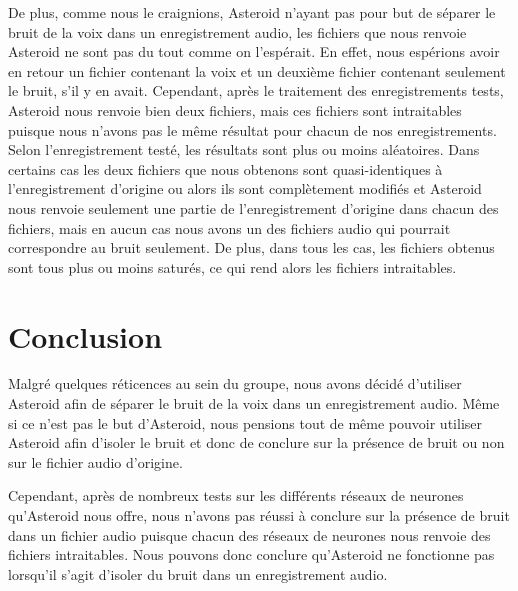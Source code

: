 \documentclass{article}
\begin{document}
De plus, comme nous le craignions, Asteroid n'ayant pas pour but de séparer le bruit de la voix dans un enregistrement audio, les fichiers que nous renvoie Asteroid ne sont pas du tout comme on l'espérait. En effet, nous espérions avoir en retour un fichier contenant la voix et un deuxième fichier contenant seulement le bruit, s'il y en avait. Cependant, après le traitement des enregistrements tests, Asteroid nous renvoie bien deux fichiers, mais ces fichiers sont intraitables puisque nous n'avons pas le même résultat pour chacun de nos enregistrements. Selon l'enregistrement testé, les résultats sont plus ou moins aléatoires. Dans certains cas les deux fichiers que nous obtenons sont quasi-identiques à l'enregistrement d'origine ou alors ils sont complètement modifiés et Asteroid nous renvoie seulement une partie de l'enregistrement d'origine dans chacun des fichiers, mais en aucun cas nous avons un des fichiers audio qui pourrait correspondre au bruit seulement. De plus, dans tous les cas, les fichiers obtenus sont tous plus ou moins saturés, ce qui rend alors les fichiers intraitables.

\section{Conclusion}

Malgré quelques réticences au sein du groupe, nous avons décidé d'utiliser Asteroid afin de séparer le bruit de la voix dans un enregistrement audio. Même si ce n'est pas le but d'Asteroid, nous pensions tout de même pouvoir utiliser Asteroid afin d'isoler le bruit et donc de conclure sur la présence de bruit ou non sur le fichier audio d'origine.

Cependant, après de nombreux tests sur les différents réseaux de neurones qu'Asteroid nous offre, nous n'avons pas réussi à conclure sur la présence de bruit dans un fichier audio puisque chacun des réseaux de neurones nous renvoie des fichiers intraitables. Nous pouvons donc conclure qu'Asteroid ne fonctionne pas lorsqu'il s'agit d'isoler du bruit dans un enregistrement audio. 
\end{document}
